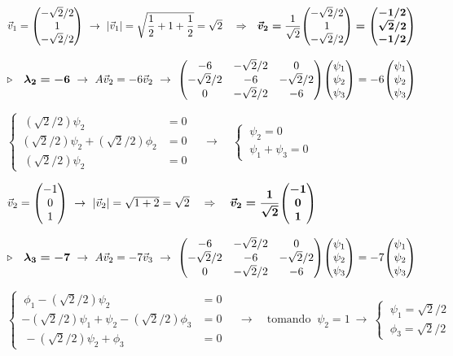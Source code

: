 $\vec v_1=\mqty(-\sqrt{2}/2 \\1\\ -\sqrt{2}/2) \ \to \ |\vec v_1|=\sqrt{\dfrac 1 2 + 1 +\dfrac 1 2}=\sqrt{2} \quad \Rightarrow \quad \boldsymbol{\vec v_2=}\dfrac{1}{\sqrt{2}} \mqty( -\sqrt{2}/2 \\ 1 \\ -\sqrt{2}/2) \boldsymbol{ =\mqty(-1/2 \\ \sqrt{2}/2 \\ -1/2) }$



$\triangleright \quad 	\boldsymbol{ \lambda_2=-6 } \ \to \ A \vec v_2 = -6 \vec v_2 \ \to \ \mqty(-6 &-\sqrt{2}/2 &0 \\ -\sqrt{2}/2&-6&-\sqrt{2}/2 \\ 0 & -\sqrt{2}/2&-6 ) \mqty( \psi_1 \\ \psi_2 \\ \psi_3) = -6 \mqty( \psi_1 \\ \psi_2 \\ \psi_3) $

$\begin{cases} \ (\sqrt{2}/2) \psi_2&=0 \\ (\sqrt{2}/2)\psi_2+(\sqrt{2}/2)\phi_2&=0   \\ \ (\sqrt{2}/2)\psi_2&=0 \end{cases} \quad\to \quad \begin{cases}\ \psi_2=0 \\ \ \psi_1+\psi_3=0 \end{cases} $

$\vec v_2= \mqty(-1\\0\\1) \ \to \ |\vec v_2|=\sqrt{1+2}=\sqrt{2}  \quad \Rightarrow \quad \boldsymbol{\vec v_2 = \dfrac 1{\sqrt{2}} \mqty(-1\\0\\1)}$



$\triangleright \quad 	\boldsymbol{ \lambda_3=-7 } \ \to \ A \vec v_2 = -7 \vec v_3 \ \to \ \mqty(-6 &-\sqrt{2}/2 &0 \\ -\sqrt{2}/2&-6&-\sqrt{2}/2 \\ 0 & -\sqrt{2}/2&-6 ) \mqty( \psi_1 \\ \psi_2 \\ \psi_3) = -7 \mqty( \psi_1 \\ \psi_2 \\ \psi_3) $

	
$\begin{cases} \ \phi_1-(\sqrt{2}/2) \psi_2&=0 \\ -(\sqrt{2}/2)\psi_1+\psi_2-(\sqrt{2}/2)\phi_3&=0   \\ \ -(\sqrt{2}/2)\psi_2+\phi_3&=0 \end{cases} \quad\to \quad  \text{tomando } \ \psi_2=1 \ \to \ \begin{cases} \ \psi_1=\sqrt{2}/2 \\ \ \phi_3=\sqrt{2}/2\end{cases}$


